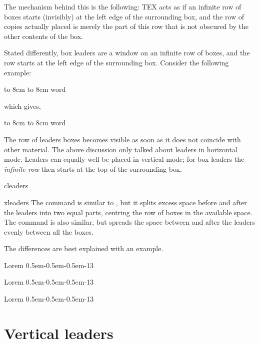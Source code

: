 The mechanism behind this is the following: TEX acts as if an infinite row of boxes starts (invisibly)
at the left edge of the surrounding box, and the row of copies actually placed is merely the part of
this row that is not obscured by the other contents of the box.

Stated differently, box leaders are a window on an infinite row of boxes, and the row starts at the
left edge of the surrounding box. Consider the following example:

\begin{texexample}{}{}
\hbox to 8cm {\leaders\copy\centerdot\hfil}
\hbox to 8cm {word\leaders\copy\centerdot\hfil}
\end{texexample}

which gives,

\hbox to 8cm {\leaders\copy\centerdot\hfil}
\hbox to 8cm {word\leaders\copy\centerdot\hfil}

The row of leaders boxes becomes visible as soon as it does not coincide with other material.
The above discussion only talked about leaders in horizontal mode. Leaders can equally well be
placed in vertical mode; for box leaders the \textit{infinite row} then starts at the top of the surrounding
box.


\begin{macro}{cleaders}
\begin{macro}{xleaders}
The  command is similar to 
, but it splits excess space before and after the leaders into two equal parts, centring the row of boxes in the available space.
The  command is also similar, but spreads the space between and after the leaders evenly between all the boxes.
\end{macro}
\end{macro}

The differences are best explained with an example.

\begin{texexample}{}{}
\def\leaderpattern{\hbox{\kern0.5em-\kern0.5em-\kern0.5em-}}
Lorem \leaders\leaderpattern\hfill 13\par
Lorem \cleaders\leaderpattern\hfill 13\par
Lorem \xleaders\leaderpattern\hfill 13\par
\end{texexample}


\section{Vertical leaders}


